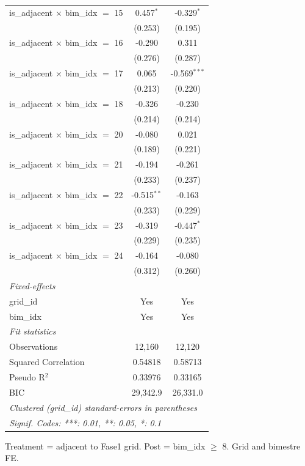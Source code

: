\begin{tabular}{lcc}
   is\_adjacent $\times$ bim\_idx $=$ 15    & 0.457$^{*}$   & -0.329$^{*}$\\   
                                            & (0.253)       & (0.195)\\   
   is\_adjacent $\times$ bim\_idx $=$ 16    & -0.290        & 0.311\\   
                                            & (0.276)       & (0.287)\\   
   is\_adjacent $\times$ bim\_idx $=$ 17    & 0.065         & -0.569$^{***}$\\   
                                            & (0.213)       & (0.220)\\   
   is\_adjacent $\times$ bim\_idx $=$ 18    & -0.326        & -0.230\\   
                                            & (0.214)       & (0.214)\\   
   is\_adjacent $\times$ bim\_idx $=$ 20    & -0.080        & 0.021\\   
                                            & (0.189)       & (0.221)\\   
   is\_adjacent $\times$ bim\_idx $=$ 21    & -0.194        & -0.261\\   
                                            & (0.233)       & (0.237)\\   
   is\_adjacent $\times$ bim\_idx $=$ 22    & -0.515$^{**}$ & -0.163\\   
                                            & (0.233)       & (0.229)\\   
   is\_adjacent $\times$ bim\_idx $=$ 23    & -0.319        & -0.447$^{*}$\\   
                                            & (0.229)       & (0.235)\\   
   is\_adjacent $\times$ bim\_idx $=$ 24    & -0.164        & -0.080\\   
                                            & (0.312)       & (0.260)\\   
   \midrule
   \emph{Fixed-effects}\\
   grid\_id                                 & Yes           & Yes\\  
   bim\_idx                                 & Yes           & Yes\\  
   \midrule
   \emph{Fit statistics}\\
   Observations                             & 12,160        & 12,120\\  
   Squared Correlation                      & 0.54818       & 0.58713\\  
   Pseudo R$^2$                             & 0.33976       & 0.33165\\  
   BIC                                      & 29,342.9      & 26,331.0\\  
   \midrule \midrule
   \multicolumn{3}{l}{\emph{Clustered (grid\_id) standard-errors in parentheses}}\\
   \multicolumn{3}{l}{\emph{Signif. Codes: ***: 0.01, **: 0.05, *: 0.1}}\\
\end{tabular}
 
\par \raggedright 
Treatment = adjacent to Fase1 grid. Post = bim\_idx $\geq$ 8. Grid and bimestre FE.
\par\endgroup


